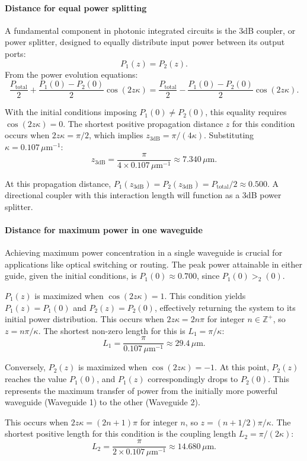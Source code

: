 \documentclass[10pt, a4paper]{article}
\begin{document}
\paragraph{Distance for equal power splitting}
A fundamental component in photonic integrated circuits is the 3dB coupler, or power splitter, designed to equally distribute input power between its output ports:
\[P_1(z) = P_2(z).\]
From the power evolution equations:
\[ \frac{P_{\text{total}}}{2} + \frac{P_1(0)-P_2(0)}{2}\cos(2z\kappa) = \frac{P_{\text{total}}}{2} - \frac{P_1(0)-P_2(0)}{2}\cos(2z\kappa). \]

With the initial conditions imposing $P_1(0) \neq P_2(0)$,
this equality requires $\cos(2z\kappa) = 0$.
The shortest positive propagation distance $z$ for this condition occurs when $2z\kappa = \pi/2$, which implies $z_{3\text{dB}} = \pi/(4\kappa)$.
Substituting $\kappa = 0.107 \, \mu\text{m}^{-1}$:
\[ z_{\text{3dB}} = \frac{\pi}{4 \times 0.107 \, \mu\text{m}^{-1}} \approx 7.340 \, \mu\text{m}. \]

At this propagation distance, $P_1(z_{\text{3dB}}) = P_2(z_{\text{3dB}}) = P_{\text{total}}/2 \approx 0.500$.
A directional coupler with this interaction length will function as a 3dB power splitter.

\paragraph{Distance for maximum power in one waveguide}
Achieving maximum power concentration in a single waveguide is crucial for applications like optical switching or routing.
The peak power attainable in either guide, given the initial conditions, is $P_1(0) \approx 0.700$, since $P_1(0) > _2(0)$.

$P_1(z)$ is maximized when $\cos(2z\kappa)=1$. This condition yields $P_1(z) = P_1(0)$ and $P_2(z) = P_2(0)$, effectively returning the system to its initial power distribution. This occurs when $2z\kappa = 2n\pi$ for integer $n\in\mathbb{Z}^+$, so $z = n\pi/\kappa$. The shortest non-zero length for this is $L_{1} = \pi/\kappa$:
\[ L_{1} = \frac{\pi}{0.107 \, \mu\text{m}^{-1}} \approx 29.4 \, \mu\text{m}. \]

Conversely, $P_2(z)$ is maximized when $\cos(2z\kappa)=-1$. At this point, $P_2(z)$ reaches the value $P_1(0)$, and $P_1(z)$ correspondingly drops to $P_2(0)$. This represents the maximum transfer of power from the initially more powerful waveguide (Waveguide 1) to the other (Waveguide 2).

This occurs when $2z\kappa = (2n+1)\pi$ for integer $n$, so $z = (n+1/2)\pi/\kappa$. The shortest positive length for this condition is the coupling length $L_{2} = \pi/(2\kappa)$:
\[ L_{2} = \frac{\pi}{2 \times 0.107 \, \mu\text{m}^{-1}} \approx 14.680 \, \mu\text{m}. \]
\end{document}
